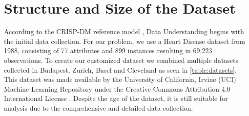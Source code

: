 \section{Structure and Size of the Dataset} \label{sec:dataUnderstanding}


According to the CRISP-DM reference model \citep{chapman2000}, Data Understanding begins with the initial data collection. For our problem, we use a Heart Disease dataset from 1988, consisting of 77 attributes and 899 instances resulting in 69.223 observations. To create our customized dataset we combined multiple datasets collected in Budapest, Zurich, Basel and Cleveland as seen in \cref{table:datasets}. This dataset was made available by the University of California, Irvine (UCI) Machine Learning Repository under the Creative Commons Attribution 4.0 International License \citep{janosi1988}. Despite the age of the dataset, it is still suitable for analysis due to the comprehensive and detailed data collection. 

